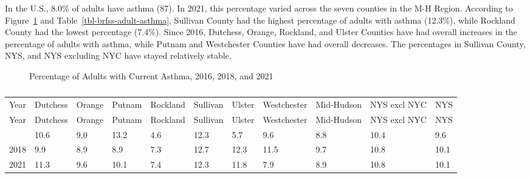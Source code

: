\documentclass[
  english,
  letterpaper,
]{report}
\begin{document}
In the U.S., 8.0\% of adults have asthma (87). In 2021, this percentage
varied across the seven counties in the M-H Region. According to
Figure~\ref{fig-brfss-adult-asthma} and
Table~\ref{tbl-brfss-adult-asthma}, Sullivan County had the highest
percentage of adults with asthma (12.3\%), while Rockland County had the
lowest percentage (7.4\%). Since 2016, Dutchess, Orange, Rockland, and
Ulster Counties have had overall increases in the percentage of adults
with asthma, while Putnam and Westchester Counties have had overall
decreases. The percentages in Sullivan County, NYS, and NYS excluding
NYC have stayed relatively stable.

\begin{figure}


\caption{\label{fig-brfss-adult-asthma}Percentage of Adults with Current
Asthma, 2016, 2018, and 2021}

\end{figure}%

\begin{longtable}[]{@{}lllllllllll@{}}

\caption{\label{tbl-brfss-adult-asthma}Percentage of Adults with Current
Asthma, 2016, 2018, and 2021}

\tabularnewline

\caption{}\label{T_aa717}\tabularnewline
\toprule\noalign{}
Year & Dutchess & Orange & Putnam & Rockland & Sullivan & Ulster &
Westchester & Mid-Hudson & NYS excl NYC & NYS \\
\midrule\noalign{}
\endfirsthead
\toprule\noalign{}
Year & Dutchess & Orange & Putnam & Rockland & Sullivan & Ulster &
Westchester & Mid-Hudson & NYS excl NYC & NYS \\
\midrule\noalign{}
\endhead
\bottomrule\noalign{}
\endlastfoot
2016 & 10.6 & 9.0 & 13.2 & 4.6 & 12.3 & 5.7 & 9.6 & 8.8 & 10.4 & 9.6 \\
2018 & 9.9 & 8.9 & 8.9 & 7.3 & 12.7 & 12.3 & 11.5 & 9.7 & 10.8 & 10.1 \\
2021 & 11.3 & 9.6 & 10.1 & 7.4 & 12.3 & 11.8 & 7.9 & 8.9 & 10.8 &
10.1 \\

\end{longtable}
\end{document}
